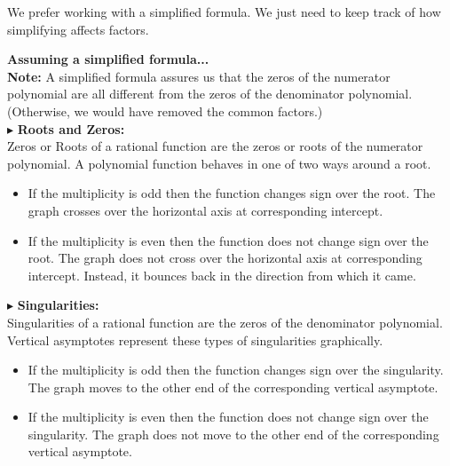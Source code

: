 \documentclass{ximera}
\begin{document}
We prefer working with a simplified formula.  We just need to keep track of how simplifying affects factors.






\textbf{\textcolor{red!80!black}{Assuming a simplified formula...}} \\


\textbf{\textcolor{red!80!black}{Note:}} A simplified formula assures us that the zeros of the numerator polynomial are all different from the zeros of the denominator polynomial. (Otherwise, we would have removed the common factors.) \\





$\blacktriangleright$ \textbf{\textcolor{red!10!blue!90!}{Roots and Zeros:}} \\
   Zeros or Roots of a rational function are the zeros or roots of the numerator polynomial.  A polynomial function behaves in one of two ways around a root.

\begin{itemize}
\item If the multiplicity is odd then the function changes sign over the root.  The graph crosses over the horizontal axis at corresponding intercept.
\item If the multiplicity is even then the function does not change sign over the root.  The graph does not cross over the horizontal axis at corresponding intercept. Instead, it bounces back in the direction from which it came.
\end{itemize}






$\blacktriangleright$ \textbf{\textcolor{red!10!blue!90!}{Singularities:}} \\
Singularities of a rational function are the zeros of the denominator polynomial.  Vertical asymptotes represent these types of singularities graphically.

\begin{itemize}
\item If the multiplicity is odd then the function changes sign over the singularity.  The graph moves to the other end of the corresponding vertical asymptote.
\item If the multiplicity is even then the function does not change sign over the singularity.  The graph does not move to the other end of the corresponding vertical asymptote. 
\end{itemize}
\end{document}

